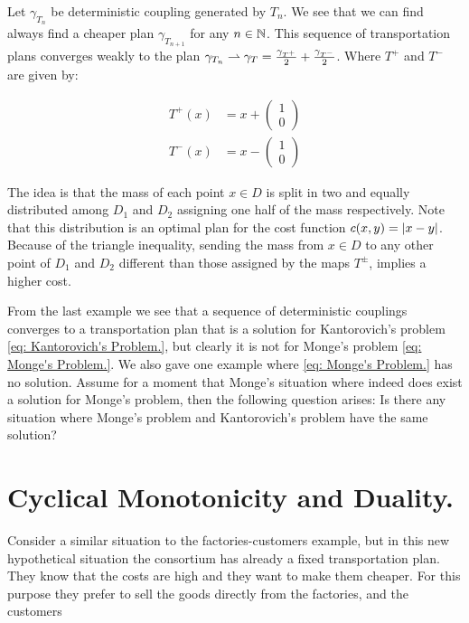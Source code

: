 Let $\gamma_{T_n}$ be deterministic coupling generated by $T_n$. We see that we can find always find a cheaper plan $\gamma_{T_{n+1}}$ for any $n\in \mathbb{N}$. This sequence of transportation plans converges weakly to the plan $\gamma_{T_n}\rightharpoonup \gamma_{T}=\frac{\gamma_{T^+}}{2}	+ \frac{\gamma_{T^-}}{2}$. Where $T^{+}$ and $T^{-}$ are given by:

\begin{align*}
T^{+}(x)&=x+\begin{pmatrix} 1 \\ 0\end{pmatrix}\\
T^{-}(x)&=x-\begin{pmatrix} 1 \\ 0\end{pmatrix}
\end{align*} 


The idea is that the mass of each point $x\in D$ is split in two and equally distributed among $D_1$ and $D_2$ assigning one half of the mass respectively. Note that this distribution is an optimal plan for the cost function $c(x,y)=\left| x-y \right|$. Because of the triangle inequality, sending the mass from $x\in D$ to any other point of $D_1$ and $D_2$ different than those assigned by the maps $T^{\pm}$, implies a higher cost.


From the last example we see that a sequence of deterministic couplings converges to a transportation plan that is a solution for Kantorovich's problem \eqref{eq: Kantorovich's Problem.}, but clearly it is not for Monge's problem \eqref{eq: Monge's Problem.}. We also gave one example where \eqref{eq: Monge's Problem.} has no solution. Assume for a moment that Monge's  situation where indeed does exist a solution for Monge's problem, then the following question arises: Is there any situation where Monge's problem and Kantorovich's problem have the same solution?


\section{Cyclical Monotonicity and Duality.}

Consider a similar situation to the factories-customers example, but in this new hypothetical situation the consortium has already a fixed transportation plan. They know that the costs are high and they want to make them cheaper. For this purpose they prefer to sell the goods directly from the factories, and the customers 

